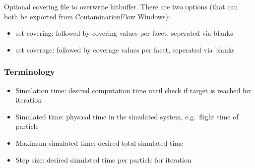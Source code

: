 \bigskip
Optional covering file to overwrite hitbuffer. There are two options (that can both be exported from ContaminationFlow Windows):
\begin{itemize}[noitemsep,topsep=0pt, partopsep=0pt]
\item  set covering:  followed by covering values per facet, seperated via blanks
\item  set coverage:  followed by coverage values per facet, seperated via blanks
\end{itemize}
%
%

\subsubsection{Terminology}
\begin{itemize}[noitemsep,topsep=0pt, partopsep=0pt]
\item Simulation time: desired computation time until check if target is reached for iteration
\item Simulated time: physical time in the simulated system, e.g.\ flight time of particle
\item Maximum simulated time: desired total simulated time
\item Step size: desired simulated time per particle for iteration
\end{itemize}


